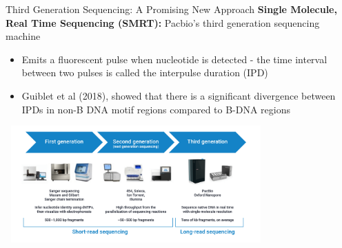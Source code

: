 \documentclass{beamer}
\begin{document}

	\begin{frame}{Third Generation Sequencing: A Promising New Approach}
		\textbf{\color{blue}Single Molecule, Real Time Sequencing (SMRT):} Pacbio's third generation sequencing machine
		\begin{itemize}
			\item Emits a fluorescent pulse when nucleotide is detected - the time interval between two pulses is called the interpulse duration (IPD)
			\item Guiblet et al (2018), showed that there is a significant divergence between IPDs in non-B DNA motif regions compared to B-DNA regions
		\end{itemize}
		
		\centering
		\includegraphics[width=10cm, height=4.5cm]{sequencing_evolution.png}
	\end{frame}
\end{document}
